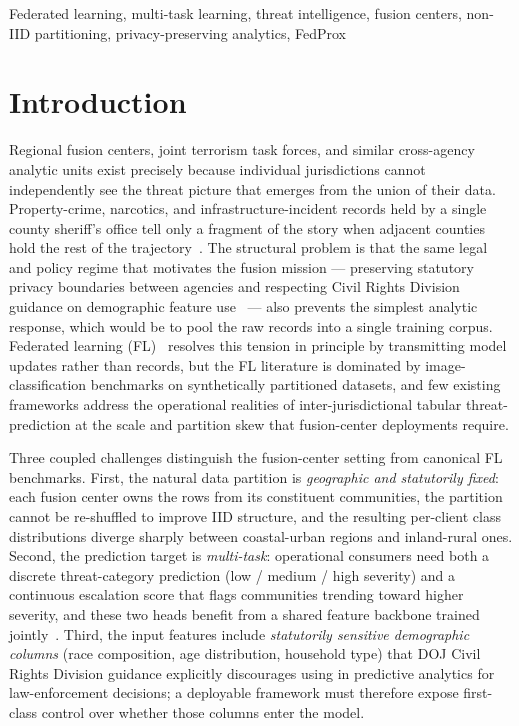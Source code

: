 \documentclass[conference]{IEEEtran}
\begin{document}
\begin{IEEEkeywords}
Federated learning, multi-task learning, threat intelligence, fusion centers, non-IID partitioning, privacy-preserving analytics, FedProx
\end{IEEEkeywords}

\section{Introduction}
\label{sec:introduction}

Regional fusion centers, joint terrorism task forces, and similar cross-agency analytic units exist precisely because individual jurisdictions cannot independently see the threat picture that emerges from the union of their data. Property-crime, narcotics, and infrastructure-incident records held by a single county sheriff's office tell only a fragment of the story when adjacent counties hold the rest of the trajectory~\cite{redlich2019fusion, monahan2010fusion}. The structural problem is that the same legal and policy regime that motivates the fusion mission --- preserving statutory privacy boundaries between agencies and respecting Civil Rights Division guidance on demographic feature use~\cite{doj2016cr} --- also prevents the simplest analytic response, which would be to pool the raw records into a single training corpus. Federated learning (FL)~\cite{mcmahan2017communication} resolves this tension in principle by transmitting model updates rather than records, but the FL literature is dominated by image-classification benchmarks on synthetically partitioned datasets, and few existing frameworks address the operational realities of inter-jurisdictional tabular threat-prediction at the scale and partition skew that fusion-center deployments require.

Three coupled challenges distinguish the fusion-center setting from canonical FL benchmarks. First, the natural data partition is \textit{geographic and statutorily fixed}: each fusion center owns the rows from its constituent communities, the partition cannot be re-shuffled to improve IID structure, and the resulting per-client class distributions diverge sharply between coastal-urban regions and inland-rural ones. Second, the prediction target is \textit{multi-task}: operational consumers need both a discrete threat-category prediction (low / medium / high severity) and a continuous escalation score that flags communities trending toward higher severity, and these two heads benefit from a shared feature backbone trained jointly~\cite{caruana1997multitask, ruder2017overview}. Third, the input features include \textit{statutorily sensitive demographic columns} (race composition, age distribution, household type) that DOJ Civil Rights Division guidance explicitly discourages using in predictive analytics for law-enforcement decisions; a deployable framework must therefore expose first-class control over whether those columns enter the model.
\end{document}
